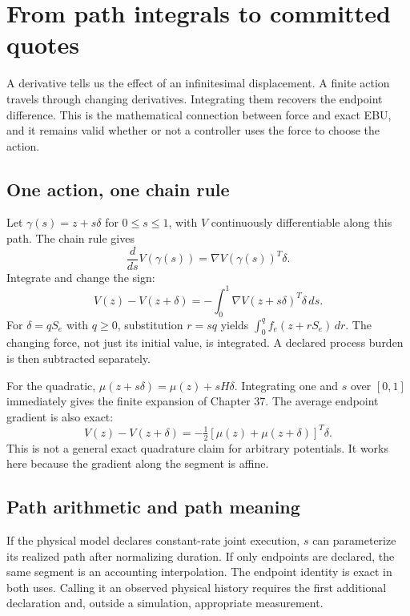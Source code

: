 \chapter{From path integrals to committed quotes}\label{ch:quotes}
A derivative tells us the effect of an infinitesimal displacement. A finite
action travels through changing derivatives. Integrating them recovers the
endpoint difference. This is the mathematical connection between force and
exact EBU, and it remains valid whether or not a controller uses the force
to choose the action.

\section{One action, one chain rule}
Let $\gamma(s)=z+s\delta$ for $0\leq s\leq1$, with $V$ continuously
differentiable along this path. The chain rule gives
\begin{equation}
 \frac{d}{ds}V(\gamma(s))=\nabla V(\gamma(s))^T\delta.
\end{equation}
Integrate and change the sign:
\begin{equation}\label{eq:path}
 V(z)-V(z+\delta)
 =-\int_0^1\nabla V(z+s\delta)^T\delta\,ds.
\end{equation}
For $\delta=qS_e$ with $q\geq0$, substitution $r=sq$ yields
$\int_0^q f_e(z+rS_e)\,dr$. The changing force, not just its initial
value, is integrated. A declared process burden is then subtracted separately.

For the quadratic, $\mu(z+s\delta)=\mu(z)+sH\delta$. Integrating one
and $s$ over $[0,1]$ immediately gives the finite expansion of Chapter 37.
The average endpoint gradient is also exact:
\begin{equation}
 V(z)-V(z+\delta)
 =-\tfrac12[\mu(z)+\mu(z+\delta)]^T\delta.
\end{equation}
This is not a general exact quadrature claim for arbitrary potentials. It
works here because the gradient along the segment is affine.

\section{Path arithmetic and path meaning}
If the physical model declares constant-rate joint execution, $s$ can
parameterize its realized path after normalizing duration. If only endpoints
are declared, the same segment is an accounting interpolation. The endpoint
identity is exact in both uses. Calling it an observed physical history
requires the first additional declaration and, outside a simulation,
appropriate measurement.

